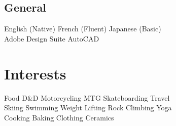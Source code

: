 \documentclass[]{willguthrie-resume}
\begin{document}
\begin{minipage}[t][][b]{0.33\textwidth}
	\subsection{General}
	English (Native) \tb French (Fluent) \tb Japanese (Basic) \\
	Adobe Design Suite \tb AutoCAD
	\sectionsep

	\section{Interests}
	Food \tb D\&D \tb Motorcycling \tb MTG \tb Skateboarding \tb Travel \\
	Skiing \tb Swimming \tb Weight Lifting \tb Rock Climbing \tb Yoga \\
	Cooking \tb Baking \tb Clothing \tb Ceramics

\end{minipage}
\hfill
\end{document}
